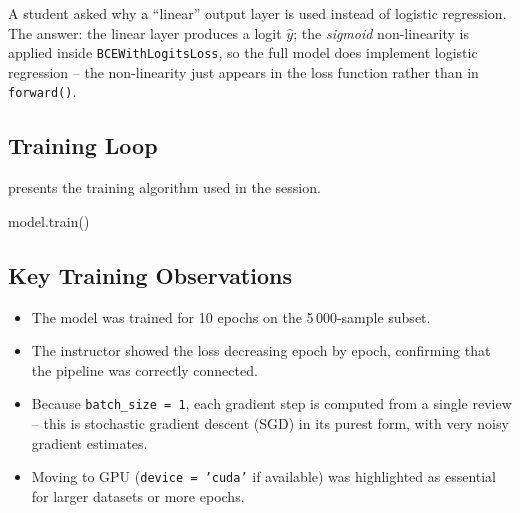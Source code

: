 \documentclass[12pt,a4paper]{article}
\begin{document}
A student asked why a ``linear'' output layer is used instead of
logistic regression.  The answer: the linear layer produces a logit
$\hat{y}$; the \emph{sigmoid} non-linearity is applied inside
\texttt{BCEWithLogitsLoss}, so the full model does implement logistic
regression -- the non-linearity just appears in the loss function rather
than in \texttt{forward()}.

\subsection{Training Loop}
\label{subsec:training_loop}

 presents the training algorithm used in the
session.

\begin{algorithm}[ht]
  \caption{RNN Sentiment Classifier Training Loop}
  \label{alg:training_loop}
  \SetAlgoLined
  \BlankLine
  model.train()\;
\end{algorithm}

\subsection{Key Training Observations}
\label{subsec:training_observations}

\begin{itemize}
  \item The model was trained for 10 epochs on the 5\,000-sample subset.
  \item The instructor showed the loss decreasing epoch by epoch,
        confirming that the pipeline was correctly connected.
  \item Because \texttt{batch\_size = 1}, each gradient step is computed
        from a single review -- this is stochastic gradient descent
        (SGD) in its purest form, with very noisy gradient estimates.
  \item Moving to GPU (\texttt{device = 'cuda'} if available) was
        highlighted as essential for larger datasets or more epochs.
\end{itemize}
\end{document}

